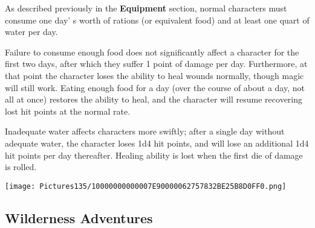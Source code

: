 \documentclass[a4paper,twoside,openany,10pt]{book}
\begin{document}
\begin{multicols}{2}
As described previously in the \textbf{Equipment} section, normal characters must consume one day' s worth of rations (or equivalent food) and at least one quart of water per day.

Failure to consume enough food does not significantly affect a character for the first two days, after which they suffer 1 point of damage per day. Furthermore, at that point the character loses the ability to heal wounds normally, though magic will still work. Eating enough food for a day (over the course of about a day, not all at once) restores the ability to heal, and the character will resume recovering lost hit points at the normal rate.

Inadequate water affects characters more swiftly; after a single day without adequate water, the character loses 1d4 hit points, and will lose an additional 1d4 hit points per day thereafter. Healing ability is lost when the first die of damage is rolled.

\end{multicols}

\vfill

\begin{center}
	\texttt{[image: Pictures135/10000000000007E90000062757832BE25B8D0FF0.png]}
\end{center}

\pagebreak

\subsection{Wilderness Adventures}\label{wilderness-adventures}
\end{document}
